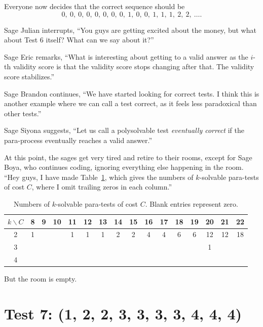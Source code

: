 \documentclass[12pt,reqno]{article}
\theoremstyle{plain}
\theoremstyle{definition}
\theoremstyle{remark}
\begin{document}
Everyone now decides that the correct sequence should be 
\[0,\ 0,\ 0,\ 0,\ 0,\ 0,\ 0,\ 0,\ 1,\ 0,\ 0,\ 1,\ 1,\ 1,\ 2,\ 2,\ \ldots.\]

Sage Julian interrupts, ``You guys are getting excited about the money, but what about Test 6 itself? What can we say about it?''

Sage Eric remarks, ``What is interesting about getting to a valid answer as the $i$-th validity score is that the validity score stops changing after that. The validity score stabilizes.''

Sage Brandon continues, ``We have started looking for correct tests. I think this is another example where we can call a test correct, as it feels less paradoxical than other tests.''

Sage Siyona suggests, ``Let us call a polysolvable test \textit{eventually correct} if the para-process eventually reaches a valid answer.''

At this point, the sages get very tired and retire to their rooms, except for Sage Boya, who continues coding, ignoring everything else happening in the room. ``Hey guys, I have made Table~\ref{tab:para-tests-by-cost}, which gives the numbers of $k$-solvable para-tests of cost $C$, where I omit trailing zeros in each column.''

\begin{table}[ht!]
\centering
\begin{tabular}{|c|c|c|c|c|c|c|c|c|c|c|c|c|c|c|c|}
\hline
$k\backslash C$ & 8 & 9 & 10 & 11 & 12 & 13 & 14 & 15 & 16 & 17 & 18 & 19 & 20 & 21 & 22 \\ \hline
2 & 1 & & & 1 & 1 & 1 & 2 & 2 & 4 & 4 & 6 & 6 & 12 & 12 & 18 \\ \hline
3 & & & & & & & & & & & & & 1 & & \\ \hline
4 & & & & & & & & & & & & & & & \\ \hline
\end{tabular}
\caption{Numbers of $k$-solvable para-tests of cost $C$. Blank entries represent zero.}
\label{tab:para-tests-by-cost}
\end{table}

But the room is empty.

\section{Test 7: (1, 2, 2, 3, 3, 3, 3, 4, 4, 4)}
\end{document}
